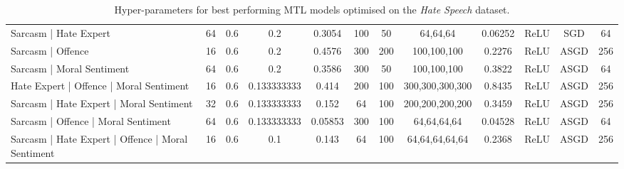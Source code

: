\begin{landscape}
\begin{table}[]
{\begin{tabular}{l|ccccccccccc}
      Sarcasm | Hate Expert                             & 64         & 0.6              & 0.2              & 0.3054  & 100           & 50     & 64,64,64        & 0.06252       & ReLU          & SGD       & 64         \\
      Sarcasm | Offence                                 & 16         & 0.6              & 0.2              & 0.4576  & 300           & 200    & 100,100,100     & 0.2276        & ReLU          & ASGD      & 256        \\
      Sarcasm | Moral Sentiment                         & 64         & 0.6              & 0.2              & 0.3586  & 300           & 50     & 100,100,100     & 0.3822        & ReLU          & ASGD      & 64         \\
      Hate Expert  | Offence | Moral Sentiment          & 16         & 0.6              & 0.133333333      & 0.414   & 200           & 100    & 300,300,300,300 & 0.8435        & ReLU          & ASGD      & 256        \\
      Sarcasm | Hate Expert | Moral Sentiment           & 32         & 0.6              & 0.133333333      & 0.152   & 64            & 100    & 200,200,200,200 & 0.3459        & ReLU          & ASGD      & 256        \\
      Sarcasm | Offence | Moral Sentiment               & 64         & 0.6              & 0.133333333      & 0.05853 & 300           & 100    & 64,64,64,64     & 0.04528       & ReLU          & ASGD      & 64         \\
      Sarcasm | Hate Expert | Offence | Moral Sentiment & 16         & 0.6              & 0.1              & 0.143   & 64            & 100    & 64,64,64,64,64  & 0.2368        & ReLU          & ASGD      & 256
    \end{tabular}%
    }
    \caption{Hyper-parameters for best performing MTL models optimised on the \textit{Hate Speech} dataset.}
    \label{tab:mtl_params_wh}
  \end{table}
  \vfill
  \begin{table}[]
    \centering
\end{table}
\end{landscape}

